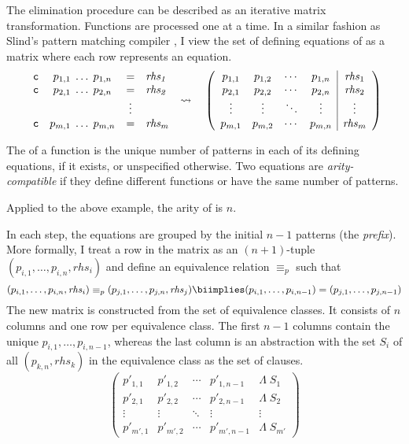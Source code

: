 The elimination procedure can be described as an iterative matrix transformation.
Functions are processed one at a time.
In a similar fashion as Slind's pattern matching compiler \cite[§3.3.1]{slind1999terminating}, I view the set of defining equations of  as a matrix where each row represents an equation.
%
\[
  \begin{array}{lccl}
    \texttt{\textup{c}} & p_{1,1}\;\ldots\;p_{1,n} &=& \mathit{rhs_1} \\
    \texttt{\textup{c}} & p_{2,1}\;\ldots\;p_{2,n} &=& \mathit{rhs_2} \\
    &&\vdots& \\
    \texttt{\textup{c}} & p_{m,1}\;\ldots\;p_{m,n} &=& \mathit{rhs_m}
  \end{array}
  \;
  \rightsquigarrow
  \quad
  \left(
    \begin{array}{cccc|c}
    p_{1,1} & p_{1,2} & \cdots & p_{1,n} & \mathit{rhs}_1 \\
    p_{2,1} & p_{2,2} & \cdots & p_{2,n} & \mathit{rhs}_2 \\
    \vdots & \vdots & \ddots & \vdots & \vdots \\
    p_{m,1} & p_{m,2} & \cdots & p_{m,n} & \mathit{rhs}_m
    \end{array}
  \right)
\]
%
\begin{definition}[Arity]
  The  of a function is the unique number of patterns in each of its defining equations, if it exists, or unspecified otherwise.
  Two equations are \emph{arity-compatible} if they define different functions or have the same number of patterns.
\end{definition}

\noindent
Applied to the above example, the arity of  is $n$.

In each step, the equations are grouped by the initial $n-1$ patterns (the \emph{prefix}).
More formally, I treat a row in the matrix as an $(n+1)$-tuple $(p_{i,1}, \ldots, p_{i,n}, \mathit{rhs}_i)$ and define an equivalence relation $\equiv_p$ such that
%
\[ (p_{i,1}, \ldots, p_{i,n}, \mathit{rhs}_i) \equiv_p (p_{j,1}, \ldots, p_{j,n}, \mathit{rhs}_j) \biimplies (p_{i,1}, \ldots, p_{i,n-1}) = (p_{j,1}, \ldots, p_{j,n-1}) \]
%
The new matrix is constructed from the set of equivalence classes.
It consists of $n$ columns and one row per equivalence class.
The first $n-1$ columns contain the unique $p_{i,1},\ldots,p_{i,n-1}$, whereas the last column is an abstraction with the set $S_i$ of all $(p_{k,n}, \mathit{rhs}_k)$ in the equivalence class as the set of clauses.
%
\[
  \left(
    \begin{array}{cccc|c}
    p'_{1,1} & p'_{1,2} & \cdots & p'_{1,n-1} & \Lambda\;S_1 \\
    p'_{2,1} & p'_{2,2} & \cdots & p'_{2,n-1} & \Lambda\;S_2 \\
    \vdots & \vdots & \ddots & \vdots & \vdots \\
    p'_{m',1} & p'_{m',2} & \cdots & p'_{m',n-1} & \Lambda\;S_{m'}
    \end{array}
  \right)
\]

